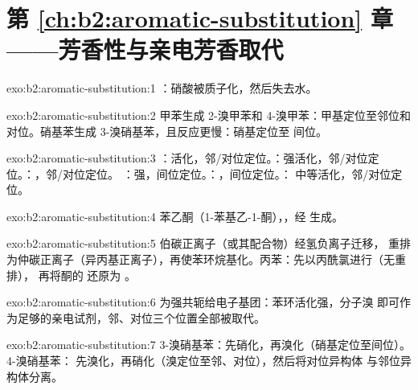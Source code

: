 \section*{第 \ref{ch:b2:aromatic-substitution} 章——芳香性与亲电芳香取代}

\begin{solution}{exo:b2:aromatic-substitution:1}
：硝酸被质子化，然后失去水。
\end{solution}

\begin{solution}{exo:b2:aromatic-substitution:2}
甲苯生成 2-溴甲苯和 4-溴甲苯：甲基定位至邻位和
对位。硝基苯生成 3-溴硝基苯，且反应更慢：硝基定位至
间位。
\end{solution}

\begin{solution}{exo:b2:aromatic-substitution:3}
：活化，邻/对位定位。：强活化，邻/对位定位。：，邻/对位定位。
：强，间位定位。：，间位定位。：
中等活化，邻/对位定位。
\end{solution}

\begin{solution}{exo:b2:aromatic-substitution:4}
苯乙酮（1-苯基乙-1-酮），，经  生成。
\end{solution}

\begin{solution}{exo:b2:aromatic-substitution:5}
伯碳正离子（或其配合物）经氢负离子迁移，
重排为仲碳正离子（异丙基正离子），再使苯环烷基化。丙苯：先以丙酰氯进行（无重排），
再将酮的  还原为 。
\end{solution}

\begin{solution}{exo:b2:aromatic-substitution:6}
 为强共轭给电子基团：苯环活化强，分子溴
即可作为足够的亲电试剂，邻、对位三个位置全部被取代。
\end{solution}

\begin{solution}{exo:b2:aromatic-substitution:7}
3-溴硝基苯：先硝化，再溴化（硝基定位至间位）。4-溴硝基苯：
先溴化，再硝化（溴定位至邻、对位），然后将对位异构体
与邻位异构体分离。
\end{solution}

